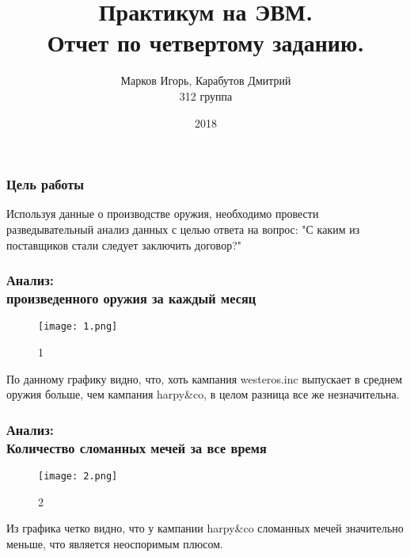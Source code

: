 \documentclass[8pt]{beamer}
\title{Практикум на ЭВМ.\\ Отчет по четвертому заданию.}
\author{Марков Игорь, Карабутов Дмитрий\\ 312 группа}
\institute{МГУ имени М.В. Ломоносова\\ Москва, Россия}
\date{2018}
\begin{document}
 
\frame{\titlepage}
 
 
 
 
 
 
 
 
\begin{frame}
\frametitle
{Цель работы}
Используя данные о производстве оружия, необходимо провести разведывательный анализ данных с целью ответа на вопрос: "С каким из поставщиков стали следует заключить договор?"
\end{frame}





\begin{frame}

\frametitle{Анализ:\\{ произведенного оружия за каждый месяц}}
\begin{figure}[h]
		\texttt{[image: 1.png]}
		\caption{1}
		\label{First}
\end{figure}
По данному графику видно, что, хоть кампания westeros.inc выпускает в среднем оружия больше, чем кампания harpy\&co, в целом разница все же незначительна.\\
\end{frame}





\begin{frame}
\frametitle{Анализ:\\{\small Количество сломанных мечей за все время}}
\begin{figure}[h]
		\texttt{[image: 2.png]}
		\caption{2}
		\label{Second}
\end{figure}
Из графика четко видно, что у кампании harpy\&co сломанных мечей значительно меньше, что является неоспоримым плюсом.
\end{frame}
\end{document}
